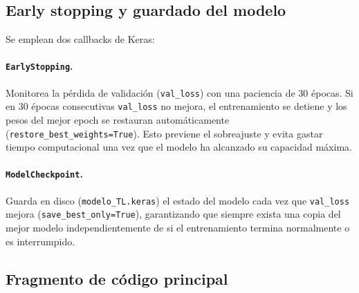 \documentclass[12pt,a4paper]{article}
\begin{document}
\subsection{Early stopping y guardado del modelo}

Se emplean dos callbacks de Keras:

\paragraph{\texttt{EarlyStopping}.}
Monitorea la pérdida de validación (\texttt{val\_loss}) con una paciencia de
30 épocas. Si en 30 épocas consecutivas \texttt{val\_loss} no mejora, el
entrenamiento se detiene y los pesos del mejor epoch se restauran automáticamente
(\texttt{restore\_best\_weights=True}). Esto previene el sobreajuste y evita
gastar tiempo computacional una vez que el modelo ha alcanzado su capacidad máxima.

\paragraph{\texttt{ModelCheckpoint}.}
Guarda en disco (\texttt{modelo\_TL.keras}) el estado del modelo cada vez
que \texttt{val\_loss} mejora (\texttt{save\_best\_only=True}), garantizando
que siempre exista una copia del mejor modelo independientemente de si el
entrenamiento termina normalmente o es interrumpido.

\subsection{Fragmento de código principal}
\end{document}
